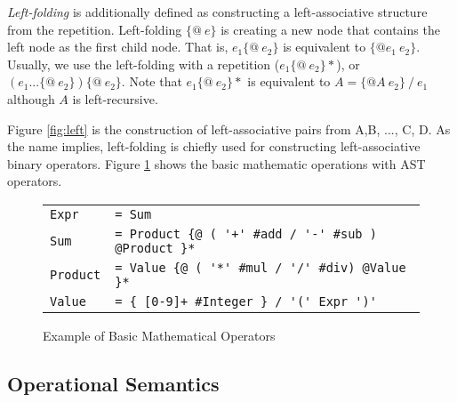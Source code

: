 \documentclass[JIP]{ipsj}
\begin{document}
{\em Left-folding} is additionally defined as constructing a left-associative structure from the repetition.  Left-folding $\{@ ~ e\}$ is creating a new node that contains the left node as the first child node. That is, $e_1 \{@ ~ e_2\}$ is equivalent to $\{@e_1 ~ e_2\}$. Usually, we use the left-folding with a repetition ($e_1 \{@ ~ e_2\}*$), or  $(e_1 ... \{@ ~ e_2\} )  \{@ ~ e_2\} $. Note that $e_1 \{@ ~ e_2\}*$ is equivalent to  $A = \{@A ~ e_2\} ~ / ~ e_1$ although $A$ is left-recursive. 

Figure \ref{fig:left} is the construction of left-associative pairs from A,B, ..., C, D. As the name implies, left-folding is chiefly used for constructing left-associative binary operators. Figure \ref{fig:math} shows the basic mathematic operations with AST operators. 

\begin{figure}[tb]
\begin{tabular}{ll} \hline
{\tt Expr} & \verb|= Sum| \\
{\tt Sum} & \verb|= Product {@ ( '+' #add / '-' #sub ) @Product }*| \\
{\tt Product} & \verb|= Value {@ ( '*' #mul / '/' #div) @Value }*| \\
{\tt Value} & \verb|= { [0-9]+ #Integer } / '(' Expr ')' | \\ \hline
\end{tabular}
\caption{Example of Basic Mathematical Operators }
\label{fig:math}
\end{figure}



\subsection{Operational Semantics}
\end{document}

